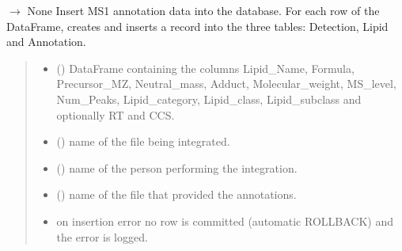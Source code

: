 \documentclass[letterpaper,10pt,english]{sphinxmanual}
\begin{document}
\begin{fulllineitems}
\label{\detokenize{api:utils.loading_MS1.DB_MS1}}
\pysigstartsignatures
\pysiglinewithargsret
{}
{\sphinxparamcomma {}\sphinxparamcomma {}\sphinxparamcomma {}}
{{ $\rightarrow$ None}}
\pysigstopsignatures
\sphinxAtStartPar
Insert MS1 annotation data into the database.
For each row of the DataFrame, creates and inserts a record into the three tables: Detection, Lipid and Annotation.
\begin{quote}\begin{description}
\begin{itemize}
\item {} 
\sphinxAtStartPar
{} () \textendash{} DataFrame containing the columns Lipid\_Name, Formula, Precursor\_MZ, Neutral\_mass, Adduct, Molecular\_weight, MS\_level, Num\_Peaks, Lipid\_category, Lipid\_class, Lipid\_subclass
and optionally RT and CCS.

\item {} 
\sphinxAtStartPar
{} () \textendash{} name of the file being integrated.

\item {} 
\sphinxAtStartPar
{} () \textendash{} name of the person performing the integration.

\item {} 
\sphinxAtStartPar
{} () \textendash{} name of the file that provided the annotations.

\end{itemize}

\begin{itemize}
\item {} 
\sphinxAtStartPar
{} \textendash{} on insertion error no row is committed (automatic ROLLBACK) and the error is logged.


\end{itemize}
\end{description}
\end{quote}
\end{fulllineitems}
\end{document}
